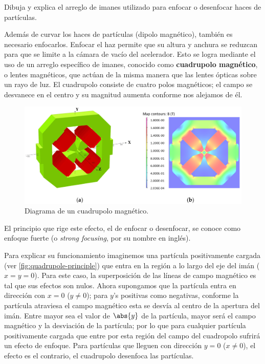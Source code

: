 \documentclass[./../main.tex]{subfiles}
\begin{document}
    \begin{exercise}
        Dibuja y explica el arreglo de imanes utilizado para enfocar o desenfocar haces de partículas.

        \begin{solution}
            Además de curvar los haces de partículas (dipolo magnético), también es necesario enfocarlos. Enfocar el haz permite que su altura y anchura se reduzcan para que se limite a la cámara de vacío del acelerador. Esto se logra mediante el uso de un arreglo específico de imanes, conocido como \textbf{cuadrupolo magnético}, o lentes magnéticos, que actúan de la misma manera que las lentes ópticas sobre un rayo de luz. El cuadrupolo consiste de cuatro polos magnéticos; el campo se desvanece en el centro y su magnitud aumenta conforme nos alejamos de él.

            \begin{figure}[htb]
                \centering
                \includegraphics[scale=0.2, trim={0cm 7cm 57cm 0}, clip]{quadrupole}
                \caption{Diagrama de un cuadrupolo magnético. \parencite{prawanta2023development}}
                \label{fig:cuadrupolo}
            \end{figure}            

            El principio que rige este efecto, el de enfocar o desenfocar, se conoce como enfoque fuerte (o \emph{strong focusing}, por su nombre en inglés).

            Para explicar su funcionamiento imaginemos una partícula positivamente cargada (ver \cref{fig:quadrupole-principle}) que entra en la región a lo largo del eje del imán (\(x = y = 0\)). Para este caso, la superposición de las líneas de campo magnético es tal que sus efectos son nulos. Ahora supongamos que la partícula entra en dirección con \(x = 0\) (\(y \neq 0\)); para \(y\)'s positivas como negativas, conforme la partícula atraviesa el campo magnético esta se desvía al centro de la apertura del imán. Entre mayor sea el valor de \(\abs{y}\) de la partícula, mayor será el campo magnético y la desviación de la partícula; por lo que para cualquier partícula positivamente cargada que entre por esta región del campo del cuadropolo sufrirá un efecto de enfoque. 
            Para partículas que lleguen con dirección \(y = 0\) (\(x \neq 0\)), el efecto es el contrario, \idest el cuadrupolo desenfoca las partículas.


\end{solution}
\end{exercise}
\end{document}
